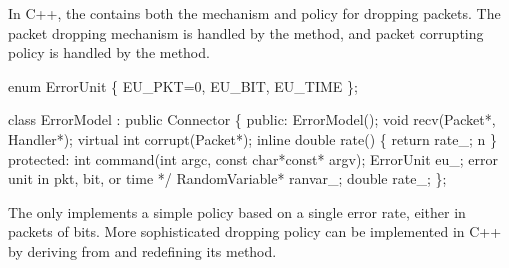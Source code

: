 In C++, the  contains both the mechanism and policy for
dropping packets.  The packet dropping mechanism is handled by the
 method, and packet corrupting policy is handled by the
 method.
\begin{program}
	enum ErrorUnit \{ EU_PKT=0, EU_BIT, EU_TIME \};

	class ErrorModel : public Connector \{
	public:
	       	ErrorModel();
	        void recv(Packet*, Handler*);
        	virtual int corrupt(Packet*);
	        inline double rate() \{ return rate_; \bs{}n \}
	protected:
        	int command(int argc, const char*const* argv);
	        ErrorUnit eu_;		\* error unit in pkt, bit, or time */
	        RandomVariable* ranvar_;
        	double rate_;
	\};
\end{program}
The  only implements a simple policy based on a single
error rate, either in packets of bits.  More sophisticated dropping
policy can be implemented in C++ by deriving from  and
redefining its  method.
